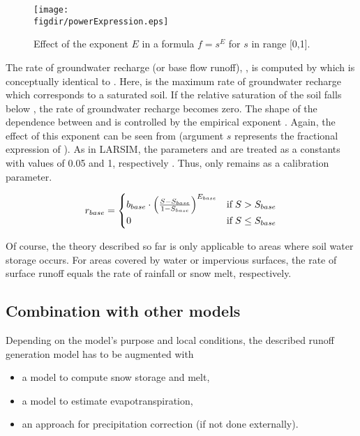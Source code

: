 \begin{figure}
  \texttt{[image: \\figdir/powerExpression.eps]}
  \caption{Effect of the exponent $E$ in a formula $f=s^E$ for $s$ in range [0,1]. \label{fig:runGen4comp_powerExpression}}
\end{figure}

The rate of groundwater recharge (or base flow runoff), \rateRunoffBase{}, is computed by  which is conceptually identical to . Here, \facBase{} is the maximum rate of groundwater recharge which corresponds to a saturated soil. If the relative saturation of the soil falls below \relSatBase{}, the rate of groundwater recharge becomes zero. The shape of the dependence between \rateRunoffBase{} and \relSat{} is controlled by the empirical exponent \expBase{}. Again, the effect of this exponent can be seen from  (argument $s$ represents the fractional expression of ). As in LARSIM, the parameters \relSatBase{} and \expBase{} are treated as a constants with values of 0.05 and 1, respectively \citep{Bremicker2006}. Thus, only \facBase remains as a calibration parameter.

\begin{align} \label{eqn:runGen4comp_baseRunoff}
  r_{base}=
  \begin{cases}
    {b_{base}} \cdot \left( \frac{S-S_{base}}{1 - S_{base}} \right) ^ {{E_{base}}} & \text{if} \; S > S_{base} \\
    0 & \text{if} \; S \le S_{base} \\
  \end{cases}
\end{align}

Of course, the theory described so far is only applicable to areas where soil water storage occurs. For areas covered by water or impervious surfaces, the rate of surface runoff \rateRunoffSurf{} equals the rate of rainfall or snow melt, respectively.


\subsection{Combination with other models} \label{sec:runGen4comp_combination}
Depending on the model's purpose and local conditions, the described runoff generation model has to be augmented with
\begin{itemize}
  \item a model to compute snow storage and melt,
  \item a model to estimate evapotranspiration,
  \item an approach for precipitation correction (if not done externally).
\end{itemize}

